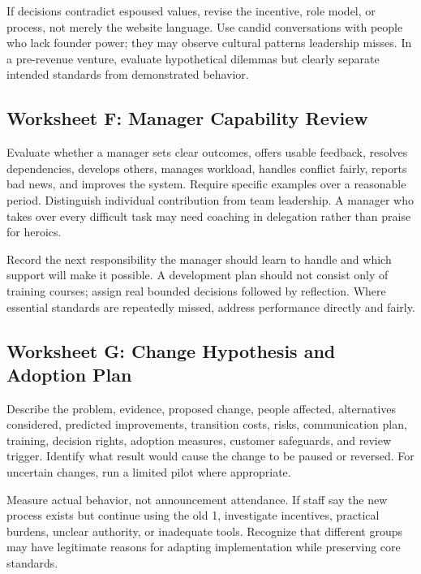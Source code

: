 If decisions contradict espoused values, revise the incentive, role model, or process, not merely the website language. Use candid conversations with people who lack founder power; they may observe cultural patterns leadership misses. In a pre-revenue venture, evaluate hypothetical dilemmas but clearly separate intended standards from demonstrated behavior.

\subsection{Worksheet F: Manager Capability Review}
\label{sec:worksheet_manager_capability_review}

Evaluate whether a manager sets clear outcomes, offers usable feedback, resolves dependencies, develops others, manages workload, handles conflict fairly, reports bad news, and improves the system. Require specific examples over a reasonable period. Distinguish individual contribution from team leadership. A manager who takes over every difficult task may need coaching in delegation rather than praise for heroics.

Record the next responsibility the manager should learn to handle and which support will make it possible. A development plan should not consist only of training courses; assign real bounded decisions followed by reflection. Where essential standards are repeatedly missed, address performance directly and fairly.

\subsection{Worksheet G: Change Hypothesis and Adoption Plan}
\label{sec:worksheet_change_hypothesis_plan}

Describe the problem, evidence, proposed change, people affected, alternatives considered, predicted improvements, transition costs, risks, communication plan, training, decision rights, adoption measures, customer safeguards, and review trigger. Identify what result would cause the change to be paused or reversed. For uncertain changes, run a limited pilot where appropriate.

Measure actual behavior, not announcement attendance. If staff say the new process exists but continue using the old 1, investigate incentives, practical burdens, unclear authority, or inadequate tools. Recognize that different groups may have legitimate reasons for adapting implementation while preserving core standards.

